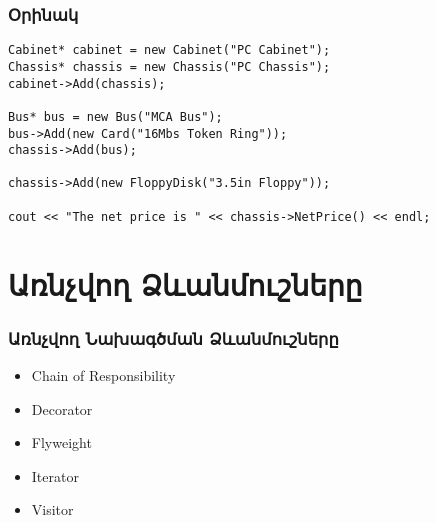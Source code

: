 \documentclass{beamer}
\begin{document}
\begin{frame}[fragile]\frametitle{Օրինակ}
\begin{english}
\begin{verbatim}
Cabinet* cabinet = new Cabinet("PC Cabinet");
Chassis* chassis = new Chassis("PC Chassis");
cabinet->Add(chassis);

Bus* bus = new Bus("MCA Bus");
bus->Add(new Card("16Mbs Token Ring"));
chassis->Add(bus);

chassis->Add(new FloppyDisk("3.5in Floppy"));

cout << "The net price is " << chassis->NetPrice() << endl;
\end{verbatim}
\end{english}
\end{frame}

\section{Առնչվող Ձևանմուշները}
\begin{frame}\frametitle{Առնչվող Նախագծման Ձևանմուշները}
\begin{itemize}
    \item Chain of Responsibility \vfill
    \item Decorator \vfill
    \item Flyweight \vfill
    \item Iterator \vfill
    \item Visitor
\end{itemize}
\end{frame}
\end{document}
